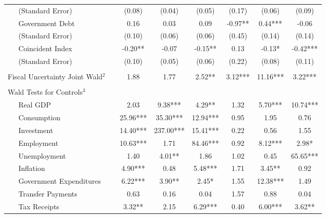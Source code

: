 \begin{table}
{\begin{center}
\begin{tabular}{l|S[table-format=3.2] S[table-format=3.2] S[table-format=3.2] S[table-format=3.2] S[table-format=3.2] S[table-format=3.2]}
~~~(Standard Error) & (0.08) & (0.04) & (0.05) & (0.17) & (0.06) & (0.09) \\ [0.2pc]
~~~Government Debt & 0.16 & 0.03 & 0.09 & -0.97** & 0.44*** & -0.06 \\
~~~(Standard Error) & (0.10) & (0.06) & (0.06) & (0.45) & (0.14) & (0.14) \\ [0.2pc]
~~~Coincident Index & -0.20** & -0.07 & -0.15** & 0.13 & -0.13* & -0.42*** \\
~~~(Standard Error) & (0.10) & (0.05) & (0.06) & (0.22) & (0.08) & (0.11) \\ [0.2pc]
\hline
 &  \\ [-0.25pc]
Fiscal Uncertainty Joint Wald$^2$~~ & 1.88 & 1.77 & 2.52** & 3.12*** & 11.16*** & 3.22*** \\ [0.5pc] \hline
 &  \\ [-0.25pc]
Wald Tests for Controls$^3$ &  \\ [0.5pc]
~~~Real GDP & 2.03 & 9.38*** & 4.29** & 1.32 & 5.70*** & 10.74*** \\
~~~Consumption & 25.96*** & 35.30*** & 12.94*** & 0.95 & 1.95 & 0.76 \\
~~~Investment & 14.40*** & 237.00*** & 15.41*** & 0.22 & 0.56 & 1.55 \\
~~~Employment & 10.63*** & 1.71 & 84.46*** & 0.92 & 8.12*** & 2.98* \\
~~~Unemployment & 1.40 & 4.01** & 1.86 & 1.02 & 0.45 & 65.65*** \\
~~~Inflation & 4.90*** & 0.48 & 5.48*** & 1.71 & 3.45** & 0.92 \\
~~~Government Expenditures & 6.22*** & 3.90** & 2.45* & 1.55 & 12.38*** & 1.49 \\
~~~Transfer Payments & 0.63 & 0.16 & 0.04 & 1.57 & 0.88 & 0.04 \\
~~~Tax Receipts & 3.32** & 2.15 & 6.29*** & 0.40 & 6.00*** & 3.62** \\



\end{tabular}
\end{center}}
\end{table}
